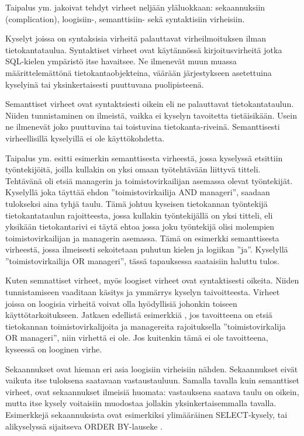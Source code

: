 \documentclass[finnish,twoside,openright]{HYgraduMLDS}
\begin{document}
Taipalus ym. \cite{Taipalus:2019:EFS:3287324.3287359} jakoivat tehdyt virheet neljään yläluokkaan: sekaannuksiin (complication), loogisiin-, semanttisiin- sekä syntaktisiin virheisiin. 

Kyselyt joissa on syntaksisia virheitä palauttavat virheilmoituksen ilman tietokantataulua. Syntaktiset virheet ovat käytännössä kirjoitusvirheitä jotka SQL-kielen ympäristö itse havaitsee. Ne ilmenevät muun muassa määrittelemättönä tietokantaobjekteina, väärään järjestykseen asetettuina kyselyinä tai yksinkertaisesti puuttuvana puolipisteenä.

Semanttiset virheet ovat syntaktsiesti oikein eli ne palauttavat tietokantataulun. Niiden tunnistaminen on ilmeistä, vaikka ei kyselyn tavoitetta tietäisikään. Usein ne ilmenevät joko puuttuvina tai toistuvina tietokanta-riveinä. Semanttisesti virheellisillä kyselyillä ei ole käyttökohdetta. 

Taipalus ym. \cite{taipalus2018errors} esitti esimerkin semanttisesta virheestä, jossa kyselyssä etsittiin työntekijöitä, joilla kullakin on yksi omaan työtehtävään liittyvä titteli. Tehtävänä oli etsiä managerin ja toimistovirkailijan asemassa olevat työntekijät. Kyselyllä joka täyttää ehdon ''toimistovirkailija AND manageri'', saadaan tulokseksi aina tyhjä taulu. Tämä johtuu kyseisen tietokannan työntekijä tietokantataulun rajoitteesta, jossa kullakin työntekijällä on yksi titteli, eli yksikään tietokantarivi ei täytä ehtoa jossa joku työntekijä olisi molempien toimistovirkailijan ja managerin asemassa. Tämä on esimerkki semanttisesta virheestä, jossa ilmeisesti sekoitetaan puhutun kielen ja logiikan ''ja''. Kyselyllä ''toimistovirkailija OR manageri'', tässä tapauksessa  saataisiin haluttu tulos.

Kuten semnattiset virheet, myös loogiset virheet ovat syntaktisesti oikeita. Niiden tunnistamiseen vaaditaan käsitys ja ymmärrys kyselyn taivoitteesta. Virheet joissa on loogisia virheitä voivat olla hyödyllisiä johonkin toiseen käyttötarkoitukseen. Jatkaen edellistä esimerkkiä \cite{taipalus2018errors}, jos tavoitteena on etsiä tietokannan toimistovirkalijoita ja managereita rajoituksella ''toimistovirkalija OR manageri'', niin virhettä ei ole. Jos kuitenkin tämä ei ole tavoitteena, kyseessä on looginen virhe.

Sekaannukset ovat hieman eri asia loogisiin virheisiin nähden. Sekaannukset eivät vaikuta itse tuloksena saatavaan vastaustauluun. Samalla tavalla kuin semanttiset virheet, ovat sekaannukset ilmeisiä huomata: vastauksena saatava taulu on oikein, mutta itse kysely voitaisiin muodostaa jollakin yksinkertaisemmalla tavalla. Esimerkkejä sekaannuksista ovat esimerkiksi ylimääräinen SELECT-kysely, tai alikyselyssä sijaitseva ORDER BY-lauseke \cite{taipalus2018errors}.
\end{document}
